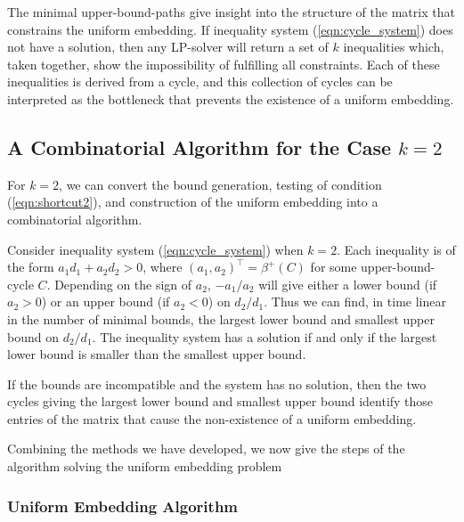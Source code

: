 \documentclass[runningheads]{llncs}
\begin{document}
The minimal upper-bound-paths give insight into the structure of the matrix that constrains the uniform embedding. If inequality system (\ref{eqn:cycle_system}) does not have a solution, then any LP-solver will return a set of $k$ inequalities which, taken together, show the impossibility of fulfilling all constraints. Each of these inequalities is derived from a cycle, and this collection of cycles can be interpreted as the bottleneck that prevents the existence of a uniform embedding. 

\subsection{A Combinatorial Algorithm for the Case $k=2$}

For $k=2$, we can convert the bound generation, testing of condition (\ref{eqn:shortcut2}), and construction of the uniform embedding into a combinatorial algorithm.


Consider inequality system (\ref{eqn:cycle_system}) when $k=2$. Each inequality is of the form  
$a_1d_1+a_2d_2>0$, where $(a_1,a_2)^\top=\beta^+(C)$ for some upper-bound-cycle $C$.
Depending on the sign of $a_2$, $-a_1/a_2$ will give either a lower bound (if $a_2>0$) or an upper bound (if $a_2<0$) on $d_2/d_1$. Thus we can find, in time linear in the number of minimal bounds, the largest lower bound and smallest upper bound on $d_2/d_1$. The inequality system has a solution if and only if the largest lower bound is smaller than the smallest upper bound. 

If the bounds are incompatible and the system has no solution, then the two cycles giving the largest lower bound and smallest upper bound identify those entries  of the matrix that cause the non-existence of a uniform embedding. 


Combining the methods we have developed, we now give the steps of the algorithm solving the uniform embedding problem

\subsubsection{Uniform Embedding Algorithm}
\end{document}
